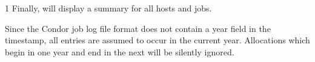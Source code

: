 \begin{ManPage}{\label{man-condor-userlog}}{1}
Finally,  will display a summary for all hosts and
jobs.

\begin{Options}
\end{Options}

\GenRem
Since the Condor job log file format does not contain a year field in
the timestamp, all entries are assumed to occur in the current year.
Allocations which begin in one year and end in the next will be
silently ignored.

\end{ManPage}
